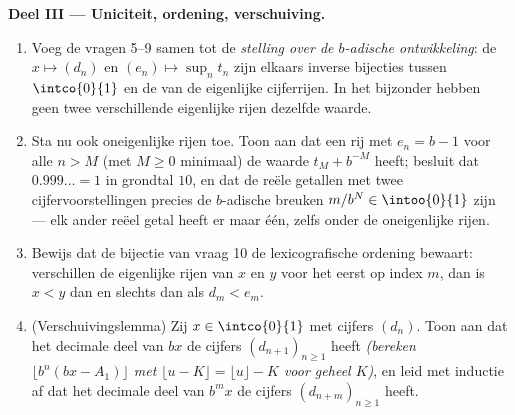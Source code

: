 \begin{problem}
\medskip
\noindent\textbf{Deel III --- Uniciteit, ordening, verschuiving.}
\begin{enumerate}[resume]
  \item Voeg de vragen 5--9 samen tot de \emph{stelling over de
        $b$-adische ontwikkeling}: de  $x \mapsto (d_n)$ en
        $(e_n) \mapsto \sup_n t_n$ zijn elkaars inverse bijecties tussen
        $\intco{0}{1}$ en de  van de eigenlijke cijferrijen.
        In het bijzonder hebben geen twee verschillende eigenlijke
        rijen dezelfde waarde.
  \item Sta nu ook oneigenlijke rijen toe. Toon aan dat een rij met $e_n
        = b - 1$ voor alle $n > M$ (met $M \geq 0$ minimaal) de waarde
        $t_M + b^{-M}$ heeft; besluit dat $0.999\dots = 1$ in grondtal
        $10$, en dat de reële getallen met twee cijfervoorstellingen
        precies de $b$-adische breuken $m/b^N \in \intoo{0}{1}$ zijn ---
        elk ander reëel getal heeft er maar één, zelfs onder de
        oneigenlijke rijen.
  \item Bewijs dat de bijectie van vraag 10 de lexicografische ordening
        bewaart: verschillen de eigenlijke rijen van $x$ en $y$ voor het
        eerst op index $m$, dan is $x < y$ dan en slechts dan als $d_m <
        e_m$.
  \item (Verschuivingslemma) Zij $x \in \intco{0}{1}$ met cijfers
        $(d_n)$. Toon aan dat het decimale deel van $bx$ de cijfers
        $(d_{n+1})_{n \geq 1}$ heeft \emph{(bereken $\lfloor b^n(bx -
        A_1)\rfloor$ met $\lfloor u - K \rfloor = \lfloor u \rfloor - K$
        voor geheel $K$)}, en leid met inductie af dat het decimale deel
        van $b^m x$ de cijfers $(d_{n+m})_{n \geq 1}$ heeft.
\end{enumerate}


\end{problem}
